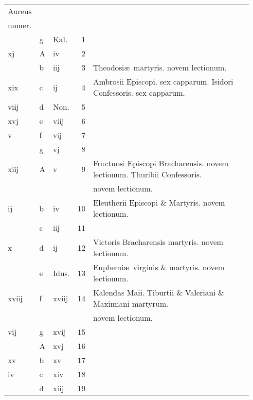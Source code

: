 \documentclass[letter,11pt]{book}
\begin{document}
\begin{center}
\begin{tabular}{l | l | l | r | l}
\color{Red}Aureus & & & \\
\color{Red}numer. & & & \\
\color{Red}  & g & \color{Red} Kal. & 1 & \\
\color{Red} xj & \color{Red} A & \color{Red} iv & 2 & \\
\color{Red}  & b & \color{Red} iij & 3 & Theodosi\ae \ martyris. \color{Red} novem lectionum. \\
\color{Red} xix & c & \color{Red} ij & 4 & Ambrosii Episcopi. \color{Red} sex capparum. \color{black} Isidori Confessoris. \color{Red} sex capparum. \\
\color{Red} viij & d & Non. & 5 & \\
\color{Red} xvj & e & \color{Red} viij & 6 & \\
\color{Red} v & f & \color{Red} vij & 7 & \\
\color{Red}  & g & \color{Red} vj & 8 & \\
\color{Red} xiij & \color{Red} A & \color{Red} v & 9 & Fructuosi Episcopi Bracharensis. \color{Red} novem lectionum. \color{black} Thuribii Confessoris. \\%
 &  &  &  & \quad \color{Red} novem lectionum. \\
\color{Red} ij & b & \color{Red} iv & 10 & Eleutherii Episcopi \& Martyris. \color{Red} novem lectionum. \\
\color{Red}  & c & \color{Red} iij & 11 & \\
\color{Red} x & d & \color{Red} ij & 12 & Victoris Bracharensis martyris. \color{Red} novem lectionum. \\
\color{Red}  & e & Idus. & 13 & Euphemi\ae \ virginis \& martyris. \color{Red} novem lectionum. \\
\color{Red} xviij & f & \color{Red} xviij & 14 & \color{Red} Kalendas Maii. \color{black} Tiburtii \& Valeriani \& Maximiani martyrum. \\
 &  &  &  & \quad \color{Red} novem lectionum. \\
\color{Red} vij & g & \color{Red} xvij & 15 & \\
\color{Red}  & \color{Red} A & \color{Red} xvj & 16 & \\
\color{Red} xv & b & \color{Red} xv & 17 & \\
\color{Red} iv & c & \color{Red} xiv & 18 & \\
\color{Red}  & d & \color{Red} xiij & 19 & \\

\end{tabular}
\end{center}
\end{document}
